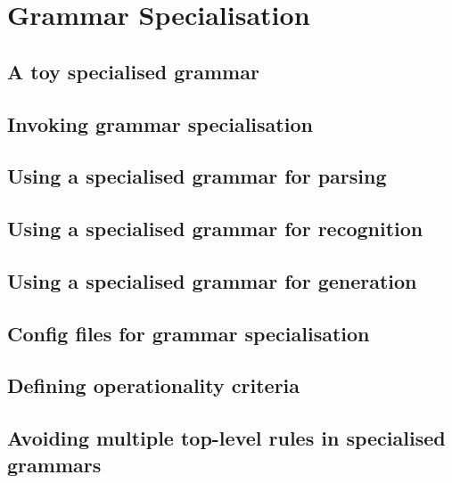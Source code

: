 \chapter{Grammar Specialisation}
\label{Chapter:GrammarSpecialisation}

\author{Manny Rayner}

\section{A toy specialised grammar}
\label{Section:ToySpecialisedGrammar}

\section{Invoking grammar specialisation}
\label{Section:InvokingSpecialisation}

\section{Using a specialised grammar for parsing}
\label{Section:SpecialisedParsing}

\section{Using a specialised grammar for recognition}
\label{Section:SpecialisedRecognition}

\section{Using a specialised grammar for generation}
\label{Section:SpecialisedGeneration}

\section{Config files for grammar specialisation}
\label{Section:SpecialisationConfig}

\section{Defining operationality criteria}
\label{Section:OperationalityCriteria}

\section{Avoiding multiple top-level rules in specialised grammars}
\label{Section:MultipleTopLevelRules}

